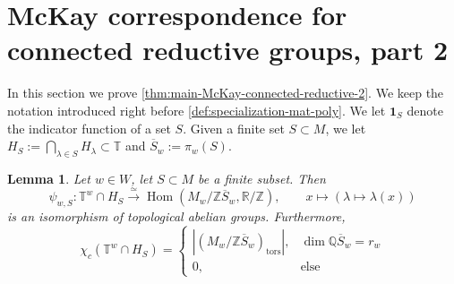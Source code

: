\documentclass[12pt,a4paper]{amsart}
\newtheorem{lemma}[lemma]{Lemma}
\theoremstyle{definition}
\newcommand{\TT}{\mathbb T}
\newcommand{\ZZ}{\mathbb{Z}}
\newcommand{\QQ}{\mathbb{Q}}
\newcommand{\RR}{\mathbb{R}}
\renewcommand{\1}{\textbf{1}}
\newcommand{\<}{\langle}
\renewcommand{\>}{\rangle}
\DeclareMathOperator{\Hom}{Hom}
\DeclareMathOperator{\tors}{tors}
\begin{document}
\section{McKay correspondence for connected reductive groups, part 2}



In this section we prove \autoref{thm:main-McKay-connected-reductive-2}. We keep the notation introduced right before \autoref{def:specialization-mat-poly}. We let $\1_S$ denote the indicator function of a set $S$. Given a finite set $S\subset M$, we let $H_{S}:=\bigcap_{\lambda\in S}H_\lambda\subset\TT$ and $\overline{S}_w:=\pi_w(S)$.



\begin{lemma}\label{l:TwcapHS-arithmetic-Tutte}
Let $w\in W$, let $S\subset M$ be a finite subset. Then
\[
		\psi_{w,S}\colon\TT^w\cap H_{S}\xrightarrow{\simeq} \Hom( M_w/\ZZ\overline{S}_w,\RR/\ZZ),\qquad x\mapsto(\lambda\mapsto\lambda(x))
\]
is an isomorphism of topological abelian groups. Furthermore,
\[
	\chi_c(\TT^w\cap H_{S})=
	\begin{cases}
		|(M_w/\ZZ\overline{S}_w)_{\tors}|,& \dim \QQ\overline{S}_w=r_w\\
		0,&\mathrm{else}
	\end{cases}
\]
\end{lemma}
\end{document}
